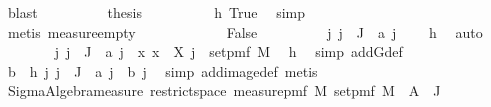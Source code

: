 \begin{isabellebody}
\ blast\isanewline
\ \ \ \ \ \ \isamarkupfalse%
\ \isamarkupfalse%
\ {\isacharquery}{\kern0pt}thesis\isanewline
\ \ \ \ \ \ \ \ \isamarkupfalse%
\ h{}\ True\ \isamarkupfalse%
\ simp\ \isanewline
\ \ \ \ \ \ \ \ \isamarkupfalse%
\ {\isacharparenleft}{\kern0pt}metis\ measure{\isacharunderscore}{\kern0pt}empty{\isacharparenright}{\kern0pt}\isanewline
\ \ \ \ \isamarkupfalse%
\isanewline
\ \ \ \ \ \ \isamarkupfalse%
\ False\isanewline
\ \ \ \ \ \ \isamarkupfalse%
\ \isamarkupfalse%
\ {\isachardoublequoteopen}{\isasymAnd}j{\isachardot}{\kern0pt}\ j\ {\isasymin}\ J\ {\isasymLongrightarrow}\ a\ j\ {\isasymnoteq}\ {\isacharbraceleft}{\kern0pt}{\isacharbraceright}{\kern0pt}{\isachardoublequoteclose}\ \isamarkupfalse%
\ h{}\ \isamarkupfalse%
\ auto\isanewline
\ \ \ \ \ \ \isamarkupfalse%
\ {\isachardoublequoteopen}{\isasymAnd}j{\isachardot}{\kern0pt}\ j\ {\isasymin}\ J\ {\isasymLongrightarrow}\ a\ j\ {\isasymin}\ {\isacharparenleft}{\kern0pt}{\isasymlambda}x{\isachardot}{\kern0pt}\ {\isacharbraceleft}{\kern0pt}x{\isacharbraceright}{\kern0pt}{\isacharparenright}{\kern0pt}\ {\isacharbackquote}{\kern0pt}\ X\ j\ {\isacharbackquote}{\kern0pt}\ set{\isacharunderscore}{\kern0pt}pmf\ M{\isachardoublequoteclose}\ \isamarkupfalse%
\ h{}\ \isamarkupfalse%
\ {\isacharparenleft}{\kern0pt}simp\ add{\isacharcolon}{\kern0pt}G{\isacharunderscore}{\kern0pt}def{\isacharparenright}{\kern0pt}\ \isanewline
\ \ \ \ \ \ \isamarkupfalse%
\ \isamarkupfalse%
\ b\ \ h{}{\isacharcolon}{\kern0pt}\ {\isachardoublequoteopen}{\isasymAnd}j{\isachardot}{\kern0pt}\ j\ {\isasymin}\ J\ {\isasymLongrightarrow}\ a\ j\ {\isacharequal}{\kern0pt}\ {\isacharbraceleft}{\kern0pt}b\ j{\isacharbraceright}{\kern0pt}{\isachardoublequoteclose}\ \isamarkupfalse%
\ {\isacharparenleft}{\kern0pt}simp\ add{\isacharcolon}{\kern0pt}image{\isacharunderscore}{\kern0pt}def{\isacharcomma}{\kern0pt}\ metis{\isacharparenright}{\kern0pt}\ \isanewline
\isanewline
\ \ \ \ \ \ \isamarkupfalse%
\ {\isachardoublequoteopen}Sigma{\isacharunderscore}{\kern0pt}Algebra{\isachardot}{\kern0pt}measure\ {\isacharparenleft}{\kern0pt}restrict{\isacharunderscore}{\kern0pt}space\ {\isacharparenleft}{\kern0pt}measure{\isacharunderscore}{\kern0pt}pmf\ M{\isacharparenright}{\kern0pt}\ {\isacharparenleft}{\kern0pt}set{\isacharunderscore}{\kern0pt}pmf\ M{\isacharparenright}{\kern0pt}{\isacharparenright}{\kern0pt}\ {\isacharparenleft}{\kern0pt}{\isasymInter}\ {\isacharparenleft}{\kern0pt}A\ {\isacharbackquote}{\kern0pt}\ J{\isacharparenright}{\kern0pt}{\isacharparenright}{\kern0pt}\ {\isacharequal}{\kern0pt}\isanewline

\end{isabellebody}
